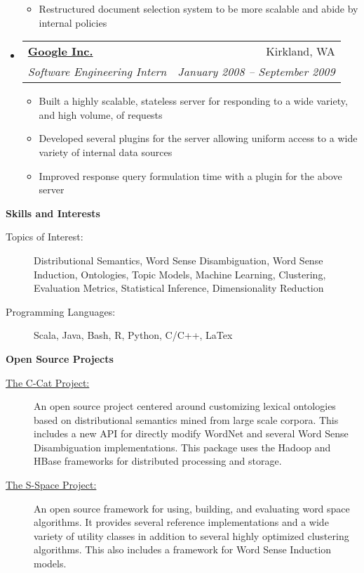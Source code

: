 \documentclass[letterpaper,11pt]{article}
\makeatletter
\newcommand{\resitem}[1]{\item #1 \vspace{-2pt}}
\newcommand{\resheading}[1]{{\large \colorbox{mygrey}{\begin{minipage}{\textwidth}{\textbf{#1 \vphantom{p\^{E}}}}\end{minipage}}}}
\newcommand{\ressubheading}[4]{
\begin{tabular*}{6.5in}{l@{\extracolsep{\fill}}r}
		\textbf{#1} & #2 \\
		\textit{#3} & \textit{#4} \\
\end{tabular*}\vspace{-6pt}}
\makeatother
\begin{document}
\begin{itemize}
{\begin{itemize}
{                       system, improving savings by up to 50\% usage of external
                       resources}
              \resitem{Restructured document selection system to be more
                       scalable and abide by internal policies}
            \end{itemize}
          }
    \item \ressubheading{\href{http://www.Google.com}
                              {Google Inc.}}
                        {Kirkland, WA}
                        {Software Engineering Intern}
                        {January 2008 -- September 2009}
          { \footnotesize
            \begin{itemize}
              \resitem{Built a highly scalable, stateless server for responding
                       to a wide variety, and high volume, of requests}
              \resitem{Developed several plugins for the server
                       allowing uniform access to a wide variety of internal data
                       sources }
              \resitem{Improved response query formulation time with a plugin
                       for the above server}
            \end{itemize}
          }
  \end{itemize}  %

\resheading{Skills and Interests}
  \begin{description}
    \item[Topics of Interest:] { 
      \footnotesize Distributional Semantics, Word Sense Disambiguation, Word
      Sense Induction, Ontologies, Topic Models, Machine Learning, Clustering,
      Evaluation Metrics, Statistical Inference, Dimensionality Reduction 
    }
    \item[Programming Languages:] {
      \footnotesize Scala, Java, Bash, R, Python, C/C++, LaTex 
    }
  \end{description} %

\resheading{Open Source Projects}
  \begin{description}
    \item[\href{https://github.com/fozziethebeat/C-Cat} {The C-Cat Project:}] {
      \footnotesize An open source project centered around customizing lexical
      ontologies based on distributional semantics mined from large scale
      corpora.  This includes a new API for directly modify WordNet and several
      Word Sense Disambiguation implementations. This
      package uses the Hadoop and HBase frameworks for distributed processing
      and storage.
    }
    \item[\href{https://github.com/fozziethebeat/S-Space} {The S-Space Project:}] {
      \footnotesize An open source framework for using, building, and evaluating
      word space algorithms.  It provides several reference implementations and
      a wide variety of utility classes in addition to several highly optimized
      clustering algorithms.  This also includes a framework for Word Sense
      Induction models.
    }
  \end{description} %
\end{document}
